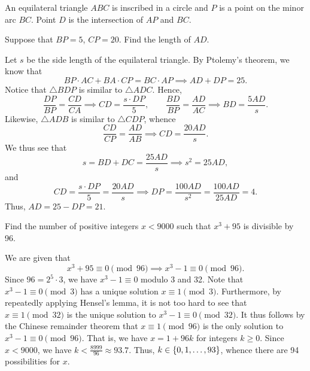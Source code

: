 \begin{question}[21]\label{Q::2024-S-1-23}
    An equilateral triangle $ABC$ is inscribed in a circle and $P$ is a point on the minor arc $BC$. Point $D$ is the intersection of $AP$ and $BC$.

    \begin{center}
    \end{center}

    \noindent Suppose that $BP = 5$, $CP = 20$. Find the length of $AD$.
\end{question}
\begin{solution*}
    Let $s$ be the side length of the equilateral triangle. By Ptolemy's theorem, we know that \[BP \cdot AC + BA \cdot CP = BC \cdot AP \implies AD + DP = 25.\] Notice that $\triangle BDP$ is similar to $\triangle ADC$. Hence, \[\frac{DP}{BP} = \frac{CD}{CA} \implies CD = \frac{s \cdot DP}{5}, \qquad \frac{BD}{BP} = \frac{AD}{AC} \implies BD = \frac{5 AD}{s}.\] Likewise, $\triangle ADB$ is similar to $\triangle CDP$, whence \[\frac{CD}{CP} = \frac{AD}{AB} \implies CD = \frac{20 AD}{s}.\] We thus see that \[s = BD + DC = \frac{25 AD}{s} \implies s^2 = 25 AD,\] and \[CD = \frac{s \cdot DP}{5} = \frac{20 AD}{s} \implies DP = \frac{100 AD}{s^2} = \frac{100 AD}{25 AD} = 4.\] Thus, $AD = 25 - DP = 21$.
\end{solution*}

\begin{question}[94]\label{Q::2024-S-1-24}
    Find the number of positive integers $x < 9000$ such that $x^3 + 95$ is divisible by 96.
\end{question}
\begin{solution*}
    We are given that \[x^3 + 95 \equiv 0 \pmod{96} \implies x^3  - 1 \equiv 0 \pmod{96}.\] Since $96 = 2^5 \cdot 3$, we have $x^3 - 1 \equiv 0$ modulo 3 and 32. Note that $x^3 - 1 \equiv 0 \pmod{3}$ has a unique solution $x \equiv 1 \pmod{3}$. Furthermore, by repeatedly applying Hensel's lemma, it is not too hard to see that $x \equiv 1 \pmod{32}$ is the unique solution to $x^3 - 1 \equiv 0 \pmod{32}$. It thus follows by the Chinese remainder theorem that $x \equiv 1 \pmod{96}$ is the only solution to $x^3 - 1 \equiv 0 \pmod{96}$. That is, we have $x = 1 + 96k$ for integers $k \geq 0$. Since $x < 9000$, we have $k < \frac{8999}{96} \approx 93.7$. Thus, $k \in \left\lbrace 0, 1, \ldots, 93 \right\rbrace$, whence there are 94 possibilities for $x$.
\end{solution*}


